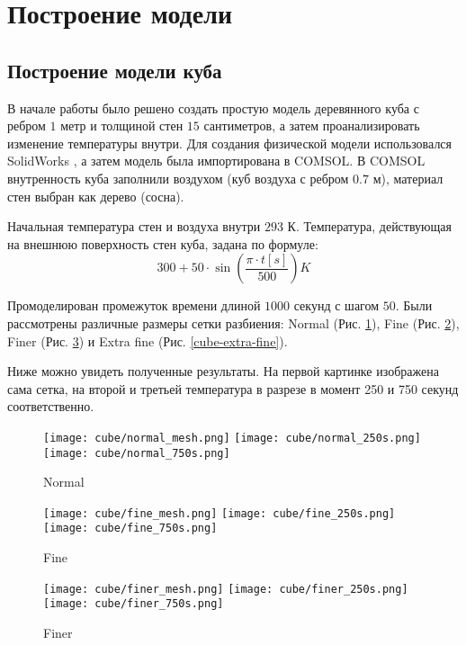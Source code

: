 \graphicspath{{./images/model}}
\section{Построение модели}


\subsection{Построение модели куба}

В начале работы было решено создать простую модель деревянного куба с ребром $1$ метр и толщиной стен $15$ сантиметров, а затем проанализировать изменение температуры внутри. Для создания физической модели использовался SolidWorks \cite{solidworks}, а затем модель была импортирована в COMSOL. В COMSOL внутренность куба заполнили воздухом (куб воздуха с ребром $0.7$ м), материал стен выбран как дерево (сосна).

Начальная температура стен и воздуха внутри $293$ К. Температура, действующая на внешнюю поверхность стен куба, задана по формуле:
\[300 + 50 \cdot \sin(\frac{\pi \cdot t[s]}{500}) K\]

Промоделирован промежуток времени длиной $1000$ секунд с шагом $50$.
Были рассмотрены различные размеры сетки разбиения: Normal (Рис. \ref{cube-normal}), Fine (Рис. \ref{cube-fine}), Finer (Рис. \ref{cube-finer}) и Extra fine (Рис. \ref{cube-extra-fine}).

Ниже можно увидеть полученные результаты. На первой картинке изображена сама сетка, на второй и третьей температура в разрезе в момент 250 и 750 секунд соответственно.

\begin{figure}[H]
\texttt{[image: cube/normal\_mesh.png]}\hfill
\texttt{[image: cube/normal\_250s.png]}\hfill
\texttt{[image: cube/normal\_750s.png]}\hfill
\caption{Normal}
\label{cube-normal}
\end{figure}

\begin{figure}[H]
\texttt{[image: cube/fine\_mesh.png]}\hfill
\texttt{[image: cube/fine\_250s.png]}\hfill
\texttt{[image: cube/fine\_750s.png]}\hfill
\caption{Fine}
\label{cube-fine}
\end{figure}

\begin{figure}[H]
\texttt{[image: cube/finer\_mesh.png]}\hfill
\texttt{[image: cube/finer\_250s.png]}\hfill
\texttt{[image: cube/finer\_750s.png]}\hfill
\caption{Finer}
\label{cube-finer}
\end{figure}

